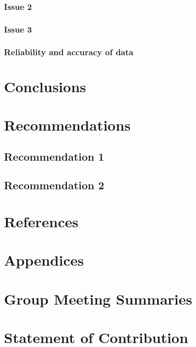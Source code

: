 \documentclass[12pt,a4paper]{article}
\begin{document}
\subsubsection{Issue 2}

\subsubsection{Issue 3}

\subsubsection{Reliability and accuracy of data}

\section{Conclusions}

\section{Recommendations}

\subsection{Recommendation 1}

\subsection{Recommendation 2}

\section{References}

\section{Appendices}

\section{Group Meeting Summaries}

\section{Statement of Contribution}
 
\end{document}

